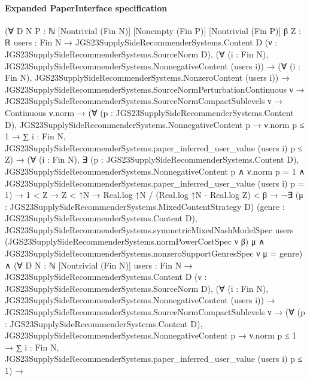 \documentclass[10pt]{article}
\begin{document}
\paragraph{Expanded PaperInterface specification}
\begin{ReviewVerbatim}
(∀ {D N P : ℕ} [Nontrivial (Fin N)] [Nonempty (Fin P)] [Nontrivial (Fin P)] {β Z : ℝ}
    {users : Fin N → JGS23SupplySideRecommenderSystems.Content D} (ν : JGS23SupplySideRecommenderSystems.SourceNorm D),
    (∀ (i : Fin N), JGS23SupplySideRecommenderSystems.NonnegativeContent (users i)) →
      (∀ (i : Fin N), JGS23SupplySideRecommenderSystems.NonzeroContent (users i)) →
        JGS23SupplySideRecommenderSystems.SourceNormPerturbationContinuous ν →
          JGS23SupplySideRecommenderSystems.SourceNormCompactSublevels ν →
            Continuous ν.norm →
              (∀ (p : JGS23SupplySideRecommenderSystems.Content D),
                  JGS23SupplySideRecommenderSystems.NonnegativeContent p →
                    ν.norm p ≤ 1 →
                      ∑ i : Fin N, JGS23SupplySideRecommenderSystems.paper_inferred_user_value (users i) p ≤ Z) →
                (∀ (i : Fin N),
                    ∃ (p : JGS23SupplySideRecommenderSystems.Content D),
                      JGS23SupplySideRecommenderSystems.NonnegativeContent p ∧
                        ν.norm p = 1 ∧ JGS23SupplySideRecommenderSystems.paper_inferred_user_value (users i) p = 1) →
                  1 < Z →
                    Z < ↑N →
                      Real.log ↑N / (Real.log ↑N - Real.log Z) < β →
                        ¬∃ (μ : JGS23SupplySideRecommenderSystems.MixedContentStrategy D) (genre :
                            JGS23SupplySideRecommenderSystems.Content D),
                            JGS23SupplySideRecommenderSystems.symmetricMixedNashModelSpec users
                                (JGS23SupplySideRecommenderSystems.normPowerCostSpec ν β) μ ∧
                              JGS23SupplySideRecommenderSystems.nonzeroSupportGenresSpec ν μ = {genre}) ∧
  (∀ {D N : ℕ} [Nontrivial (Fin N)] {users : Fin N → JGS23SupplySideRecommenderSystems.Content D}
      (ν : JGS23SupplySideRecommenderSystems.SourceNorm D),
      (∀ (i : Fin N), JGS23SupplySideRecommenderSystems.NonnegativeContent (users i)) →
        JGS23SupplySideRecommenderSystems.SourceNormCompactSublevels ν →
          (∀ (p : JGS23SupplySideRecommenderSystems.Content D),
              JGS23SupplySideRecommenderSystems.NonnegativeContent p →
                ν.norm p ≤ 1 →
                  ∑ i : Fin N, JGS23SupplySideRecommenderSystems.paper_inferred_user_value (users i) p ≤ 1) →

\end{ReviewVerbatim}
\end{document}
